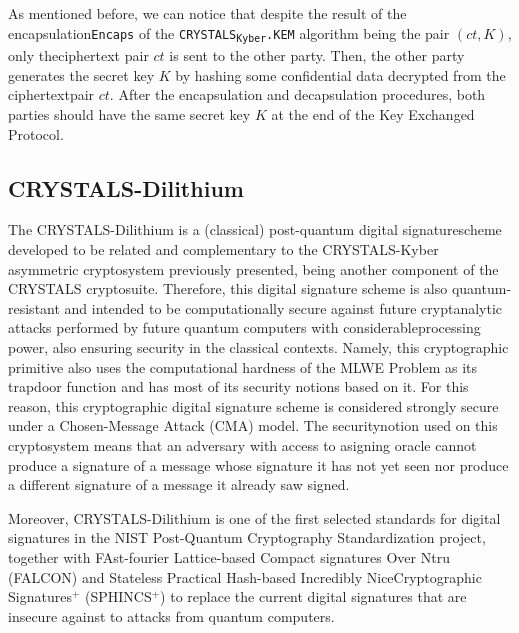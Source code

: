 \documentclass[runningheads]{llncs}
\numberwithin{equation}{section}
\begin{document}
    \noindent As mentioned before, we can notice that despite the result of the encapsulation\break \texttt{Encaps} of the \texorpdfstring{\texttt{CRYSTALS}\textsubscript{\texttt{Kyber}}\texttt{.KEM}}\/ algorithm being the pair $(ct, K)$, only the\break ciphertext pair $ct$ is sent to the other party. Then, the other party generates the secret key $K$ by hashing some confidential data decrypted from the ciphertext\break pair $ct$. After the encapsulation and decapsulation procedures, both parties should have the same secret key $K$ at the end of the Key Exchanged Protocol.\break
    
    
    \subsection{CRYSTALS-Dilithium}
    \label{subsec:crystals-dilithium}

    The CRYSTALS-Dilithium \cite{ducas-et-al:crystals-dilithium-algorithm-specifications-and-supporting-documentation:2017:06-2024,ducas-et-al:crystals-dilithium-lattice-based-digital-signature-scheme:2018:06-2024} is a (classical) post-quantum digital signature\break scheme developed to be related and complementary to the CRYSTALS-Kyber asymmetric cryptosystem previously presented, being another component of the CRYSTALS cryptosuite. Therefore, this digital signature scheme is also quantum-resistant and intended to be computationally secure against future cryptanalytic attacks performed by future quantum computers with considerable\break processing power, also ensuring security in the classical contexts. Namely, this cryptographic primitive also uses the computational hardness of the MLWE Problem as its trapdoor function and has most of its security notions based on it. For this reason, this cryptographic digital signature scheme is considered strongly secure under a Chosen-Message Attack (CMA) model. The security\break notion used on this cryptosystem means that an adversary with access to a\break signing oracle cannot produce a signature of a message whose signature it has not yet seen nor produce a different signature of a message it already saw signed.
    
    Moreover, CRYSTALS-Dilithium is one of the first selected standards for digital signatures in the NIST Post-Quantum Cryptography Standardization project, together with FAst-fourier Lattice-based Compact signatures Over Ntru (FALCON) \cite{gentry-peikert-vaikuntanathan:trapdoors-hard-lattices-and-new-cryptographic-constructions:2007:06-2024,fouque-et-al:falcon-fast-fourier-lattice-based-compact-signatures-over-ntru:2019:06-2024} and Stateless Practical Hash-based Incredibly Nice\break Cryptographic Signatures${}^{+}$ (SPHINCS${}^{+}$) \cite{bernstein-et-al:sphincs-practical-stateless-hash-based-signatures:2015:06-2024,bernstein-et-al:sphincs+-signature-framework:2019:06-2024} to replace the current digital signatures that are insecure against to attacks from quantum computers.
    
\end{document}
